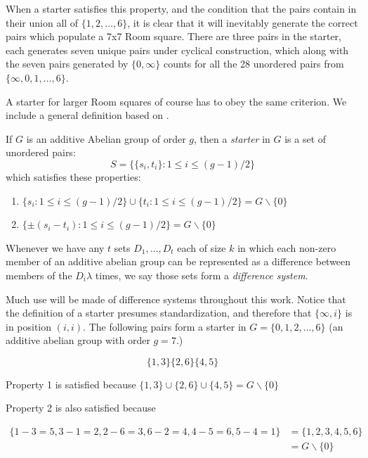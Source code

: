 \documentclass[
  11pt,
  a4paper]{book}
\begin{document}
When a starter satisfies this property, and the condition
that the pairs contain in their union all of
\(\{1, 2, \ldots, 6\}\), it is clear that it will inevitably generate
the correct pairs which populate a 7x7 Room square. There
are three pairs in the starter, each generates seven unique
pairs under cyclical construction, which along with the
seven pairs generated by \(\{0, \infty\}\) counts for all the
28 unordered pairs from \(\{\infty, 0, 1, \ldots, 6\}\).

A starter for larger Room squares of course has to obey the same
criterion. We include a general definition based on
\textcite{dinitz_contemporary_1992}.

If \(G\) is an additive Abelian group of order \(g\), then a
\emph{starter} in \(G\) is a set of unordered pairs:
\[S = \{\{s_i, t_i\}:1 \leq i \leq (g - 1)/2\}\]
which satisfies these properties:

\begin{enumerate}
  \item{$\{s_i:1 \leq i \leq (g-1)/2\} \cup \{t_i : 1 \leq i \leq (g-1)/2\} = G \backslash \{0\}$}
  \item{$\{\pm (s_i - t_i ) : 1 \leq i \leq (g-1)/2 \} = G \backslash \{0\}$}
\end{enumerate}

Whenever we have any \(t\) sets \(D_1, \ldots, D_t\) each of
size \(k\) in which each non-zero member of an additive
abelian group can be represented as a difference between
members of the \(D_i \lambda\) times, we say those sets form a
\emph{difference system}.

Much use will be made of difference systems throughout this
work. Notice that the definition of a starter presumes
standardization, and therefore that \(\{\infty, i\}\) is in
position \((i, i)\). The following pairs form a starter in
\(G = \{0, 1, 2, \ldots, 6\}\) (an additive abelian group with
order \(g = 7\).)

\begin{equation}
\{1,3\} \{2,6\} \{4,5\}
\end{equation}

Property 1 is satisfied because
\(\{1,3\} \cup \{2,6\} \cup \{4,5\} = G \backslash \{0\}\)

Property 2 is also satisfied because

\begin{equation}
\begin{split}
\{1 - 3 = 5, 3 - 1 = 2, 2 - 6 = 3, 6 - 2 = 4, 4 - 5 = 6, 5 - 4 = 1\} &= \{1, 2, 3, 4, 5, 6\} \\
 &= G\backslash \{0\}
\end{split}
\end{equation}
\end{document}
